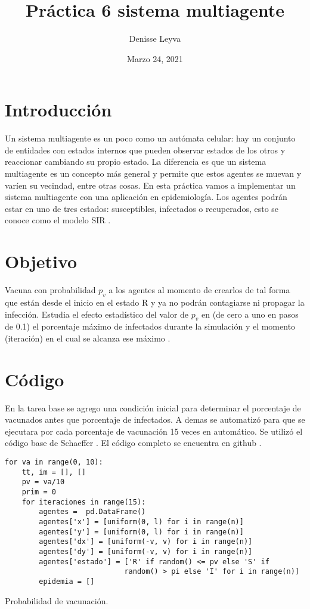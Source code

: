 \documentclass{article}
\title{Práctica 6 sistema multiagente}
\author{Denisse Leyva}
\date{Marzo 24, 2021}
\begin{document}
\maketitle


\section{Introducción}
Un sistema multiagente es un poco como un autómata celular: hay un conjunto de entidades con estados internos que pueden observar estados de los otros y reaccionar cambiando su propio estado. La diferencia es que un sistema multiagente es un concepto más general y permite que estos agentes se muevan y varíen su vecindad, entre otras cosas. En esta práctica vamos a implementar un sistema multiagente con una aplicación en epidemiología. Los agentes podrán estar en uno de tres estados: susceptibles, infectados o recuperados, esto se conoce como el modelo SIR \cite{Satu_Elisa_Schaeffer}.


\section{Objetivo}
Vacuna con probabilidad $p_{v}$ a los agentes al momento de crearlos de tal forma que están desde el inicio en el estado R y ya no podrán contagiarse ni propagar la infección. Estudia el efecto estadístico del valor de $p_{v}$ en (de cero a uno en pasos de 0.1) el porcentaje máximo de infectados durante la simulación y el momento (iteración) en el cual se alcanza ese máximo \cite{Satu_Elisa_Schaeffer}. 

\section{Código}
En la tarea base se agrego una condición inicial para determinar el porcentaje de vacunados antes que porcentaje de infectados. A demas se automatizó para que se ejecutara por cada porcentaje de vacunación 15 veces en automático. Se utilizó el código base de Schaeffer \cite{Elisa_Schaeffer}. El código completo se encuentra en github \cite{Denisse_Leyva}.

\renewcommand{\listingscaption}{Código}
\begin{listing}[H]
  \begin{verbatim}
for va in range(0, 10):
    tt, im = [], []
    pv = va/10
    prim = 0
    for iteraciones in range(15):
        agentes =  pd.DataFrame()
        agentes['x'] = [uniform(0, l) for i in range(n)]
        agentes['y'] = [uniform(0, l) for i in range(n)]
        agentes['dx'] = [uniform(-v, v) for i in range(n)]
        agentes['dy'] = [uniform(-v, v) for i in range(n)]
        agentes['estado'] = ['R' if random() <= pv else 'S' if
                            random() > pi else 'I' for i in range(n)]
        epidemia = []
  \end{verbatim}
  \label{lst:fibo}
  \caption{Probabilidad de vacunación.}
\end{listing}
\end{document}
